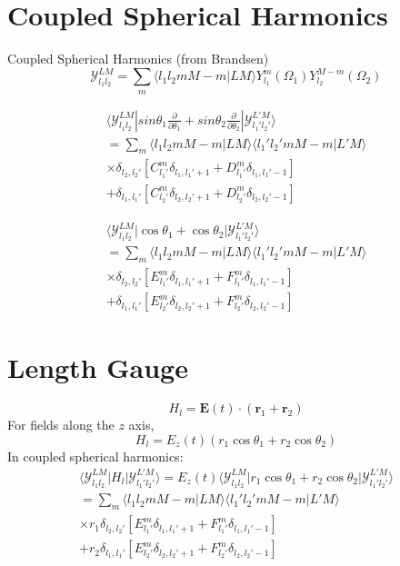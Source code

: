 \documentclass[a4paper,12pt]{paper}
\newcommand{\innerprod}[2]{\langle #1 | #2 \rangle}
\newcommand{\matelem}[3]{\langle #1 | #2 | #3 \rangle}
\newcommand{\cg}[6]{\innerprod{#1 #2 #3 #4}{#5 #6}}
\newcommand{\partialdiff}[2]{\frac{\partial #1}{\partial #2}}
\renewcommand{\vec}[1]{\ensuremath{\textbf{#1}}}
\begin{document}
\section{Coupled Spherical Harmonics}
Coupled Spherical Harmonics (from Brandsen)
\begin{equation}
	\label{eqn:coupled-sph}
	\mathcal{Y}_{l_1 l_2}^{LM} = \sum_m \cg{l_1}{l_2}{m}{M-m}{L}{M}
Y_{l_1}^m(\Omega_1) Y_{l_2}^{M-m}(\Omega_2) 
\end{equation}

\begin{eqnarray}
  \matelem
	{\mathcal{Y}_{l_1 l_2}^{LM}}
	{sin \theta_1 \partialdiff{}{\theta_1}
	+sin \theta_2 \partialdiff{}{\theta_2}}
	{\mathcal{Y}_{l_1' l_2'}^{L'M}}
	\\ =
   \sum_m
	\cg{l_1}{l_2}{m}{M-m}{L}{M}
	\cg{l_1'}{l_2'}{m}{M-m}{L'}{M} \\
	\times \delta_{l_2, l_2'} \left[ 
		C_{l_1'}^m \delta_{l_1, l_1'+1} 
		+ D_{l_1'}^m \delta_{l_1, l_1'-1}  \right] \\
	+ \delta_{l_1, l_1'} \left[ 
		C_{l_2'}^m \delta_{l_2, l_2'+1} 
		+ D_{l_2'}^m \delta_{l_2, l_2'-1}  \right]
\end{eqnarray}

\begin{eqnarray}
  \matelem
	{\mathcal{Y}_{l_1 l_2}^{LM}}
	{\cos \theta_1 + \cos \theta_2}
	{\mathcal{Y}_{l_1' l_2'}^{L'M}} \\ = 
   \sum_m
	\cg{l_1}{l_2}{m}{M-m}{L}{M}
	\cg{l_1'}{l_2'}{m}{M-m}{L'}{M} \\
	\times \delta_{l_2, l_2'} \left[ 
		E_{l_1'}^m \delta_{l_1, l_1'+1} 
		+ F_{l_1'}^m \delta_{l_1, l_1'-1}  \right] \\
	+ \delta_{l_1, l_1'} \left[ 
		E_{l_2'}^m \delta_{l_2, l_2'+1} 
		+ F_{l_2'}^m \delta_{l_2, l_2'-1}  \right]
\end{eqnarray}


\section{Length Gauge}

\begin{equation}
 	H_l = \vec{E}(t) \cdot (\vec{r}_1 + \vec{r}_2)
\end{equation}
For fields along the $z$ axis, 
\begin{equation}
	H_l = E_z(t) (r_1 \cos \theta_1 + r_2 \cos \theta_2)
\end{equation}
In coupled spherical harmonics:
\begin{eqnarray}
   \matelem
	{\mathcal{Y}_{l_1 l_2}^{LM}}
	{H_l}
	{\mathcal{Y}_{l_1' l_2'}^{L'M}} = E_z(t) 
    \matelem
	{\mathcal{Y}_{l_1 l_2}^{LM}}
	{r_1 \cos \theta_1 + r_2 \cos \theta_2}
	{\mathcal{Y}_{l_1' l_2'}^{L'M}} \\ =
   \sum_m
	\cg{l_1}{l_2}{m}{M-m}{L}{M}
	\cg{l_1'}{l_2'}{m}{M-m}{L'}{M} \\
	\times r_1 \delta_{l_2, l_2'} \left[ 
		E_{l_1'}^m \delta_{l_1, l_1'+1} 
		+ F_{l_1'}^m \delta_{l_1, l_1'-1}  \right] \\
	+ r_2 \delta_{l_1, l_1'} \left[ 
		E_{l_2'}^m \delta_{l_2, l_2'+1} 
		+ F_{l_2'}^m \delta_{l_2, l_2'-1}  \right]
\end{eqnarray}
\end{document}
